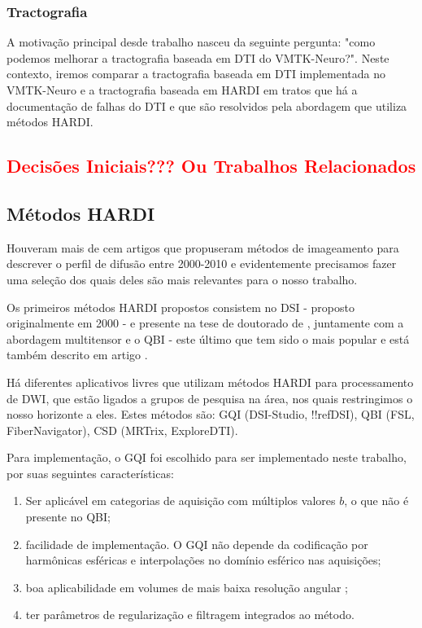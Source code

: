 \documentclass[
    12pt,                %
    oneside,            %
    a4paper,            %
    english,            %
    french,                %
    spanish,            %
    brazil                %
    ]{abntex2}
\begin{document}
\subsection{Tractografia}

A motivação principal desde trabalho nasceu da seguinte pergunta: "como podemos melhorar a tractografia baseada em DTI do VMTK-Neuro?". Neste contexto, iremos comparar a tractografia baseada em DTI implementada no VMTK-Neuro e a tractografia baseada em HARDI em tratos que há a documentação de falhas do DTI e que são resolvidos pela abordagem que utiliza métodos HARDI.





\textcolor{red}{
\chapter{Decisões Iniciais??? Ou Trabalhos Relacionados}
\label{chapter::decisoesiniciais}
}

\section{Métodos HARDI}

Houveram mais de cem artigos que propuseram métodos de imageamento para descrever o perfil de difusão entre 2000-2010 \cite{descoteaux2015} e evidentemente precisamos fazer uma seleção dos quais deles são mais relevantes para o nosso trabalho.

Os primeiros métodos HARDI propostos consistem no DSI \cite{wedeen2005} - proposto originalmente em 2000 - e presente na tese de doutorado de , juntamente com a abordagem multitensor e o QBI - este último que tem sido o mais popular e está também descrito em artigo \cite{TuchQBall2004}.

Há diferentes aplicativos livres que utilizam métodos HARDI para processamento de DWI, que estão ligados a grupos de pesquisa na área, nos quais restringimos o nosso horizonte a eles. Estes métodos são: GQI (DSI-Studio, !!refDSI), QBI (FSL, FiberNavigator), CSD (MRTrix, ExploreDTI).

Para implementação, o GQI foi escolhido para ser implementado neste trabalho, por suas seguintes características:

\begin{enumerate}
    \item Ser aplicável em categorias de aquisição com múltiplos valores $b$, o que não é presente no QBI;
    \item facilidade de implementação. O GQI não depende da codificação por harmônicas esféricas e interpolações no domínio esférico nas aquisições;
    \item boa aplicabilidade em volumes de mais baixa resolução angular \cite{yeh2010};
    \item ter parâmetros de regularização e filtragem integrados ao método.
\end{enumerate}
\end{document}
